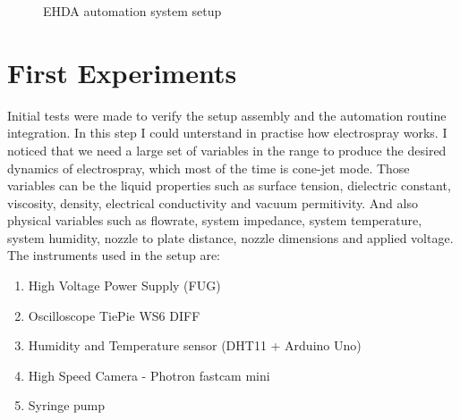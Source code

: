 
\begin{figure}[H]
  \centering
  \caption{EHDA automation system setup}
  \label{fig:setup}
\end{figure}


\section{First Experiments}
\label{sec:first_experiments}

Initial tests were made to verify the setup assembly and the automation routine integration. In this step I could unterstand in practise how electrospray works.
I noticed that we need a large set of variables in the range to produce the desired dynamics of electrospray, which most of the time is cone-jet mode. Those variables can be the liquid properties such as surface tension, dielectric constant, viscosity, density, electrical conductivity and vacuum permitivity. And also physical variables such as flowrate, system impedance, system temperature, system humidity, nozzle to plate distance, nozzle dimensions and applied voltage.
The instruments used in the setup are:

\begin{enumerate}[a]
  \item High Voltage Power Supply (FUG)
  \item Oscilloscope TiePie WS6 DIFF 
  \item Humidity and Temperature sensor (DHT11 + Arduino Uno)
  \item High Speed Camera - Photron fastcam mini
  \item Syringe pump
  \end{enumerate}

\clearpage
